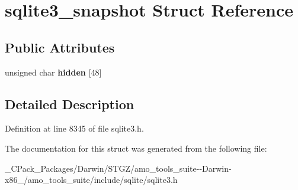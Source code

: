 \hypertarget{structsqlite3__snapshot}{}\section{sqlite3\+\_\+snapshot Struct Reference}
\label{structsqlite3__snapshot}
\subsection*{Public Attributes}
\begin{DoxyCompactItemize}
\item 
\mbox{\label{structsqlite3__snapshot_a1e286b808bce9c56082c1aa775127d5a}} 
unsigned char {\bfseries hidden} \mbox{[}48\mbox{]}
\end{DoxyCompactItemize}


\subsection{Detailed Description}


Definition at line 8345 of file sqlite3.\+h.



The documentation for this struct was generated from the following file\+:\begin{DoxyCompactItemize}
\item 
\+\_\+\+C\+Pack\+\_\+\+Packages/\+Darwin/\+S\+T\+G\+Z/amo\+\_\+tools\+\_\+suite-\/-\/\+Darwin-\/x86\+\_/amo\+\_\+tools\+\_\+suite/include/sqlite/sqlite3.\+h\end{DoxyCompactItemize}
